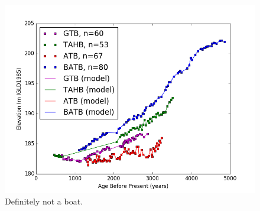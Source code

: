 \begin{figure}[h]
	\includegraphics[width=\linewidth]{data/theData.png}
	\caption{Definitely not a boat.}
	\label{fig:rawDataWithModel}
\end{figure}
